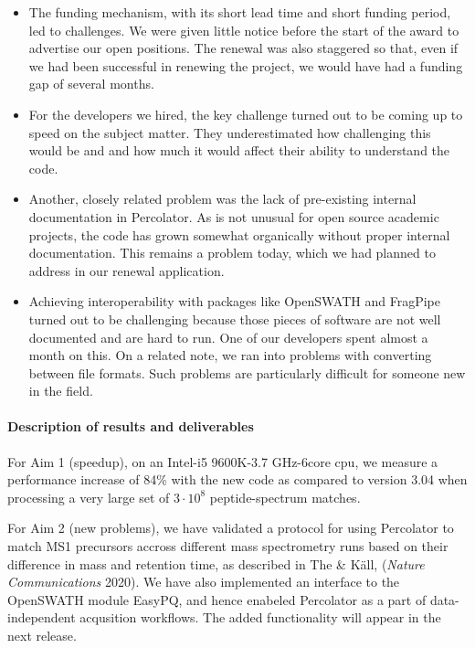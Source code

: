 \documentclass{article}
\begin{document}
\begin{itemize}
  \item The funding mechanism, with its short lead time and short
    funding period, led to challenges.  We were given little notice
    before the start of the award to advertise our open positions.
    The renewal was also staggered so that, even if we had been
    successful in renewing the project, we would have had a funding
    gap of several months.
  \item For the developers we hired, the key challenge turned out to
    be coming up to speed on the subject matter.  They underestimated
    how challenging this would be and and how much it would affect
    their ability to understand the code.
  \item Another, closely related problem was the lack of pre-existing
    internal documentation in Percolator.  As is not unusual for open
    source academic projects, the code has grown somewhat organically
    without proper internal documentation. This remains a problem
    today, which we had planned to address in our renewal application. 
  \item Achieving interoperability with packages like OpenSWATH and
    FragPipe turned out to be challenging because those pieces of
    software are not well documented and are hard to run. One of our
    developers spent almost a month on this.  On a related note, we
    ran into problems with converting between file formats. Such
    problems are particularly difficult for someone new in the field.
\end{itemize}

\paragraph{Description of results and deliverables}

For Aim 1 (speedup), on an Intel-i5 9600K-3.7 GHz-6core cpu, we measure a
performance increase of 84\% with the new code as compared to version
3.04 when processing a very large set of $3\cdot10^8$ peptide-spectrum
matches.

For Aim 2 (new problems), we have validated a protocol for using
Percolator to match MS1 precursors accross different mass spectrometry
runs based on their difference in mass and retention time, as
described in The \& K\"{a}ll, ({\em Nature Communications} 2020). We
have also implemented an interface to the OpenSWATH module EasyPQ, and
hence enabeled Percolator as a part of data-independent acqusition
workflows. The added functionality will appear in the next release.
\end{document}
